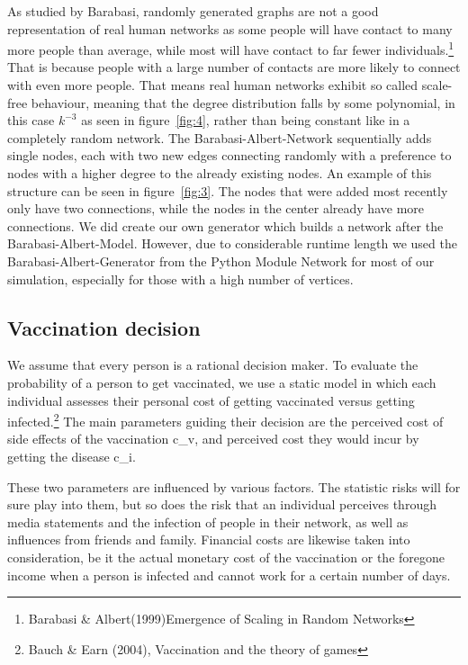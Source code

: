 \documentclass[11pt]{article}
\begin{document}
As studied by Barabasi, randomly generated graphs are not a good representation of real human networks as some people will have contact to many more people than average, while most will have contact to far fewer individuals.\footnote{Barabasi \& Albert(1999)Emergence of Scaling in Random Networks} That is because people with a large number of contacts are more likely to connect with even more people. That means real human networks exhibit so called scale-free behaviour, meaning that the degree distribution falls by some polynomial, in this case $k^{-3}$ as seen in figure~\ref{fig:4}, rather than being constant like in a completely random network.  The Barabasi-Albert-Network sequentially adds single nodes, each with two new edges connecting randomly with a preference to nodes with a higher degree to the already existing nodes. An example of this structure can be seen in figure~\ref{fig:3}. The nodes that were added most recently only have two connections, while the nodes in the center already have more connections. We did create our own generator which builds a network after the Barabasi-Albert-Model. However, due to considerable runtime length we used the Barabasi-Albert-Generator from the Python Module Network for most of our simulation, especially for those with a high number of vertices.
\vspace{14px}




\subsection{Vaccination decision}

We assume that every person is a rational decision maker. To evaluate the probability of a person to get vaccinated, we use a static model in which each individual assesses their personal cost of getting vaccinated versus getting infected.\footnote{Bauch \& Earn (2004), Vaccination and the theory of games}  The main parameters guiding their decision are the perceived cost of side effects of the vaccination c\_v, and perceived cost they would incur by getting the disease c\_i.

These two parameters are influenced by various factors. The statistic risks will for sure play into them, but so does the risk that an individual perceives through media statements and
the infection of people in their network, as well as influences from friends and family. Financial costs are likewise taken into consideration, be it the actual monetary cost of the vaccination or the foregone income when a person is infected and cannot work for a certain number of days.  
\end{document}
